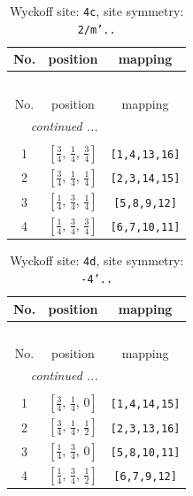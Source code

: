 \documentclass[fleqn,8pt]{jsarticle}
\begin{document}
\renewcommand{\arraystretch}{1.2}
\begin{longtable}{ccc}
\caption{Wyckoff site: {\tt 4c}, site symmetry: {\tt 2/m'..}}
 \\
 \hline \hline
No. & position & mapping \\ \hline \endfirsthead

\multicolumn{2}{l}{\tablename\ \thetable{}} \\
 \hline \hline
No. & position & mapping \\ \hline \endhead

 \hline \hline
\multicolumn{2}{r}{\footnotesize\it continued ...} \\ \endfoot

 \hline \hline
\multicolumn{2}{r}{} \\ \endlastfoot

1 & $\left[ \frac{3}{4},\, \frac{1}{4},\, \frac{3}{4} \right]$ & {\tt [1,4,13,16]} \\ \hline
2 & $\left[ \frac{3}{4},\, \frac{1}{4},\, \frac{1}{4} \right]$ & {\tt [2,3,14,15]} \\ \hline
3 & $\left[ \frac{1}{4},\, \frac{3}{4},\, \frac{1}{4} \right]$ & {\tt [5,8,9,12]} \\ \hline
4 & $\left[ \frac{1}{4},\, \frac{3}{4},\, \frac{3}{4} \right]$ & {\tt [6,7,10,11]} \\
\end{longtable}
\renewcommand{\arraystretch}{1.2}
\begin{longtable}{ccc}
\caption{Wyckoff site: {\tt 4d}, site symmetry: {\tt -4'..}}
 \\
 \hline \hline
No. & position & mapping \\ \hline \endfirsthead

\multicolumn{2}{l}{\tablename\ \thetable{}} \\
 \hline \hline
No. & position & mapping \\ \hline \endhead

 \hline \hline
\multicolumn{2}{r}{\footnotesize\it continued ...} \\ \endfoot

 \hline \hline
\multicolumn{2}{r}{} \\ \endlastfoot

1 & $\left[ \frac{3}{4},\, \frac{1}{4},\, 0 \right]$ & {\tt [1,4,14,15]} \\ \hline
2 & $\left[ \frac{3}{4},\, \frac{1}{4},\, \frac{1}{2} \right]$ & {\tt [2,3,13,16]} \\ \hline
3 & $\left[ \frac{1}{4},\, \frac{3}{4},\, 0 \right]$ & {\tt [5,8,10,11]} \\ \hline
4 & $\left[ \frac{1}{4},\, \frac{3}{4},\, \frac{1}{2} \right]$ & {\tt [6,7,9,12]} \\
\end{longtable}
\end{document}
